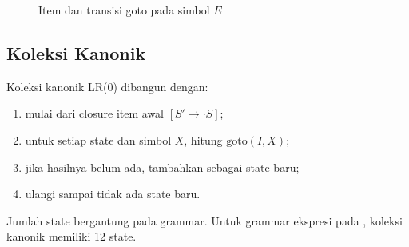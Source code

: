 \begin{figure}[H]
\centering
{}
\caption{Item dan transisi goto pada simbol \(E\)}
\label{fig:ch12-item}
\end{figure}

\subsection{Koleksi Kanonik}

Koleksi kanonik LR(0) dibangun dengan:
\begin{enumerate}[label=\arabic*.,leftmargin=*]
  \item mulai dari closure item awal \([S' \to \cdot S]\);
  \item untuk setiap state dan simbol \(X\), hitung
        \(\text{goto}(I,X)\);
  \item jika hasilnya belum ada, tambahkan sebagai state baru;
  \item ulangi sampai tidak ada state baru.
\end{enumerate}

Jumlah state bergantung pada grammar. Untuk grammar ekspresi pada
, koleksi kanonik memiliki 12 state.

